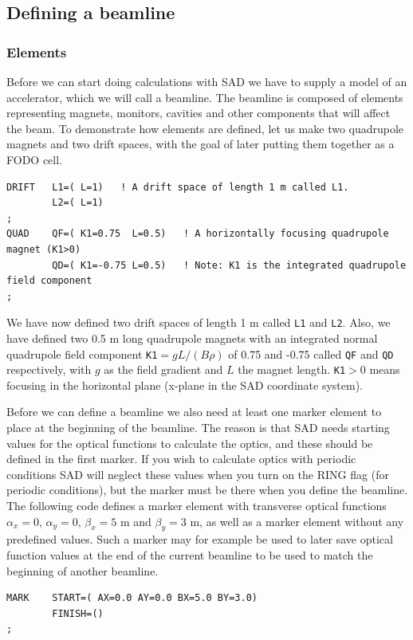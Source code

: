 \documentclass{article}
\begin{document}
\subsection{Defining a beamline}

\subsubsection{Elements}
Before we can start doing calculations with SAD we have to supply a model of an accelerator, which we will call a beamline.
The beamline is composed of elements representing magnets, monitors, cavities and other components that will affect the beam. To demonstrate how elements are defined, let us make two quadrupole magnets and two drift spaces, with the goal of later putting them together as a FODO cell.
\begin{lstlisting}
DRIFT   L1=( L=1)   ! A drift space of length 1 m called L1.
        L2=( L=1)
;
QUAD    QF=( K1=0.75  L=0.5)   ! A horizontally focusing quadrupole magnet (K1>0)
        QD=( K1=-0.75 L=0.5)   ! Note: K1 is the integrated quadrupole field component
;
\end{lstlisting}
We have now defined two drift spaces of length 1 m called \texttt{L1} and \texttt{L2}. Also, we have defined two 0.5 m long quadrupole magnets with an integrated normal quadrupole field component \texttt{K1}$=gL/(B\rho)$ of 0.75 and -0.75 called \texttt{QF} and \texttt{QD} respectively, with $g$ as the field gradient and $L$ the magnet length. \texttt{K1}$>0$ means focusing in the horizontal plane (x-plane in the SAD coordinate system).
\par
Before we can define a beamline we also need at least one marker element to place at the beginning of the beamline. The reason is that SAD needs starting values for the optical functions to calculate the optics, and these should be defined in the first marker. If you wish to calculate optics with periodic conditions SAD will neglect these values when you turn on the RING flag (for periodic conditions), but the marker must be there when you define the beamline. The following code defines a marker element with transverse optical functions $\alpha_x=0$, $\alpha_y=0$, $\beta_x=5$ m and $\beta_y=3$ m, as well as a marker element without any predefined values. Such a marker may for example be used to later save optical function values at the end of the current beamline to be used to match the beginning of another beamline.
\begin{lstlisting}
MARK    START=( AX=0.0 AY=0.0 BX=5.0 BY=3.0)
        FINISH=()
;
\end{lstlisting}
\end{document}
